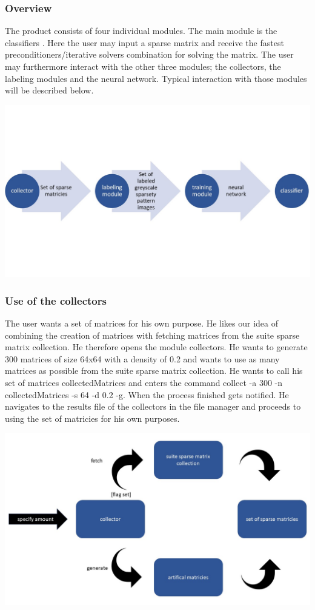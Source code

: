 \documentclass[parskip=full]{scrartcl}
\begin{document}
\subsubsection{Overview}
The product consists of four individual modules. The main module is the \glspl{classifier} . Here the user may input a sparse matrix and receive the fastest \glspl{preconditioner}/\glspl{iterative solver} combination for solving the matrix. The user may furthermore interact with the other three modules; the \glspl{collector}, the \glspl{labeling module} and the neural network.  Typical interaction with those modules will be described below.
\begin{center}
\includegraphics[width=\textwidth]{workflow}
\end{center}

\subsubsection{Use of the \glspl{collector}}
The user wants a set of matrices for his own purpose. He likes our idea of combining the creation of matrices with fetching matrices from the suite sparse matrix collection. He therefore opens the module \glspl{collector}. He wants to generate 300 matrices of size 64x64 with a density of 0.2 and wants to use as many matrices as possible from the suite sparse matrix collection. He wants to call his set of matrices collectedMatrices and enters the command collect -a 300 -n collectedMatrices -s 64 -d 0.2 -g. When the process finished gets notified. He navigates to the results file of the \glspl{collector} in the file manager and proceeds to using the set of matricies for his own purposes.
\begin{center}
\includegraphics[width=\textwidth]{collector}
\end{center}
\end{document}
